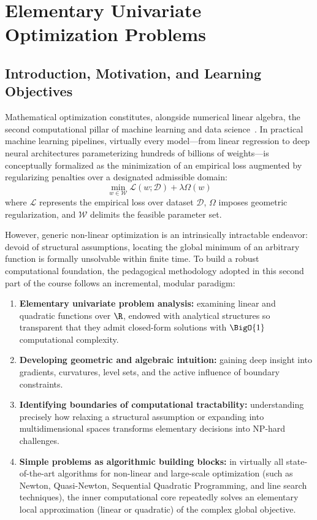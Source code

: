 \chapter{Elementary Univariate Optimization Problems}
\label{chap:simple-optimization-problems}

\FloatBarrier
\section{Introduction, Motivation, and Learning Objectives}
\label{sec:opt-intro-motivation}

Mathematical optimization constitutes, alongside numerical linear algebra, the second computational pillar of machine learning and data science~\cite{boyd2004convex,nocedal2006numerical}. In practical machine learning pipelines, virtually every model---from linear regression to deep neural architectures parameterizing hundreds of billions of weights---is conceptually formalized as the minimization of an empirical loss augmented by regularizing penalties over a designated admissible domain:
\begin{equation}
\min_{w \in \mathcal{W}} \mathcal{L}(w; \mathcal{D}) + \lambda \Omega(w)
\end{equation}
where $\mathcal{L}$ represents the empirical loss over dataset $\mathcal{D}$, $\Omega$ imposes geometric regularization, and $\mathcal{W}$ delimits the feasible parameter set.

However, generic non-linear optimization is an intrinsically intractable endeavor: devoid of structural assumptions, locating the global minimum of an arbitrary function is formally unsolvable within finite time. To build a robust computational foundation, the pedagogical methodology adopted in this second part of the course follows an incremental, modular paradigm:
\begin{enumerate}
    \item \textbf{Elementary univariate problem analysis:} examining linear and quadratic functions over $\R$, endowed with analytical structures so transparent that they admit closed-form solutions with $\BigO{1}$ computational complexity.
    \item \textbf{Developing geometric and algebraic intuition:} gaining deep insight into gradients, curvatures, level sets, and the active influence of boundary constraints.
    \item \textbf{Identifying boundaries of computational tractability:} understanding precisely how relaxing a structural assumption or expanding into multidimensional spaces transforms elementary decisions into NP-hard challenges.
    \item \textbf{Simple problems as algorithmic building blocks:} in virtually all state-of-the-art algorithms for non-linear and large-scale optimization (such as Newton, Quasi-Newton, Sequential Quadratic Programming, and line search techniques), the inner computational core repeatedly solves an elementary local approximation (linear or quadratic) of the complex global objective.
\end{enumerate}

